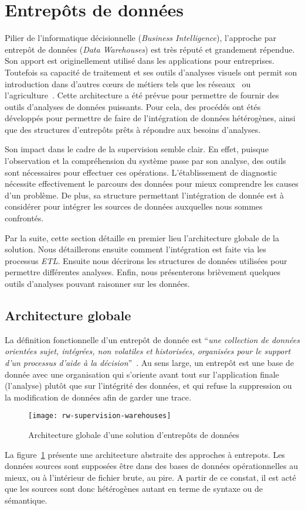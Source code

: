 \section{Entrepôts de données}\label{sec:rw:supervision:warehouse}
Pilier de l'informatique décisionnelle (\textit{Business Intelligence}), l'approche par entrepôt de données (\textit{Data Warehouses}) est très réputé et grandement répendue. Son apport est originellement utilisé dans les applications pour entreprises. Toutefois sa capacité de traitement et ses outils d'analyses visuels ont permit son introduction dans d'autres cœurs de métiers tels que les réseaux~\cite{refneeded} ou l'agriculture~\cite{Abdullah:olap}. Cette architecture a été prévue pour permettre de fournir des outils d'analyses de données puissants. Pour cela, des procédés ont étés développés pour permettre de faire de l'intégration de données hétérogènes, ainsi que des structures d'entrepôts prêts à répondre aux besoins d'analyses.

Son impact dans le cadre de la supervision semble clair. En effet, puisque l'observation et la compréhension du système passe par son analyse, des outils sont nécessaires pour effectuer ces opérations. L'établissement de diagnostic nécessite effectivement le parcours des données pour mieux comprendre les causes d'un problème. De plus, sa structure permettant l'intégration de donnée est à considérer pour intégrer les sources de données auxquelles nous sommes confrontés.

Par la suite, cette section détaille en premier lieu l'architecture globale de la solution. Nous détaillerons ensuite comment l'intégration est faite via les processus \textit{ETL}. Ensuite nous décrirons les structures de données utilisées pour permettre différentes analyses. Enfin, nous présenterons brièvement quelques outils d'analyses pouvant raisonner sur les données.

\subsection{Architecture globale}
La définition fonctionnelle d'un entrepôt de donnée est \enquote{\it une collection de données orientées sujet, intégrées, non volatiles et historisées, organisées pour le support d’un processus d’aide à la décision}~\cite{Inmon:warehouse}. Au sens large, un entrepôt est une base de donnée avec une organisation qui s'oriente avant tout sur l'application finale (l'analyse) plutôt que sur l'intégrité des données, et qui refuse la suppression ou la modification de données afin de garder une trace.
\begin{figure}[ht]
	\centering
	\texttt{[image: rw-supervision-warehouses]}
	\caption{Architecture globale d'une solution d'entrepôts de données}\label{fig:rw:supervision:warehouses}
\end{figure}
La figure~\ref{fig:rw:supervision:warehouses} présente une architecture abstraite des approches à entrepots. Les données sources sont supposées être dans des bases de données opérationnelles au mieux, ou à l'intérieur de fichier brute, au pire. A partir de ce constat, il est acté que les sources sont donc hétérogènes autant en terme de syntaxe ou de sémantique.

